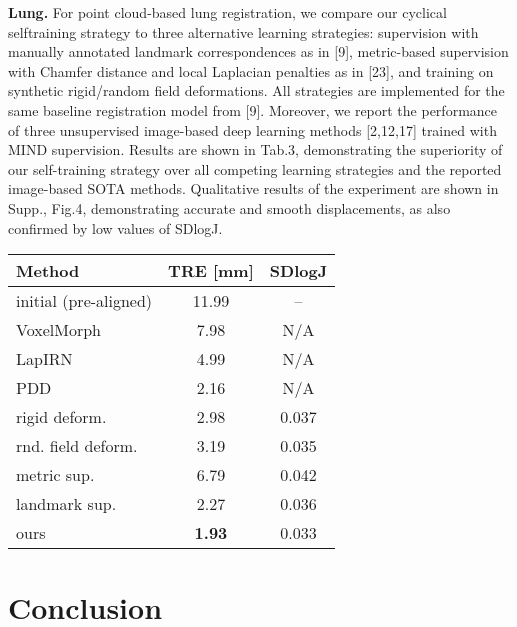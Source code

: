 \textbf{Lung. }For point cloud-based lung registration, we compare our cyclical selftraining strategy to three alternative learning strategies: supervision with manually annotated landmark correspondences as in [9], metric-based supervision with Chamfer distance and local Laplacian penalties as in [23], and training on synthetic rigid/random field deformations. All strategies are implemented for the same baseline registration model from [9]. Moreover, we report the performance of three unsupervised image-based deep learning methods [2,12,17] trained with MIND supervision. Results are shown in Tab.3, demonstrating the superiority of our self-training strategy over all competing learning strategies and the reported image-based SOTA methods. Qualitative results of the experiment are shown in Supp., Fig.4, demonstrating accurate and smooth displacements, as also confirmed by low values of SDlogJ.

\begin{table}
  \vspace{0.5em}\centering\wuhao
  \begin{tabular}{lcc}
    \toprule
    \textbf{Method}       & \textbf{TRE [mm]} & \textbf{SDlogJ} \\
    \midrule
    initial (pre-aligned) & 11.99             & --              \\
    VoxelMorph            & 7.98              & {N/A}           \\
    LapIRN                & 4.99              & {N/A}           \\
    PDD                   & 2.16              & {N/A}           \\
    \midrule
    rigid deform.         & 2.98              & 0.037           \\
    rnd. field deform.    & 3.19              & 0.035           \\
    metric sup.           & 6.79              & 0.042           \\
    landmark sup.         & 2.27              & 0.036           \\
    \midrule
    ours                  & \textbf{1.93}     & 0.033           \\
    \bottomrule
  \end{tabular}
\end{table}

\section{Conclusion}

